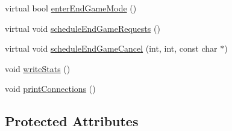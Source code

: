 \begin{DoxyCompactItemize}
\item 
virtual bool \hyperlink{classBTPeerWireBase_aa6dc6370b6ef5b1e84c7d02505ffebbf}{enter\+End\+Game\+Mode} ()
\item 
virtual void \hyperlink{classBTPeerWireBase_afc4fec75e43462e0197fad7100cc17a0}{schedule\+End\+Game\+Requests} ()
\item 
virtual void \hyperlink{classBTPeerWireBase_a061ffb43d2ff5ed63c9863c47c487792}{schedule\+End\+Game\+Cancel} (int, int, const char $\ast$)
\item 
void \hyperlink{classBTPeerWireBase_a52324b2b9722e0facde1083ace692308}{write\+Stats} ()
\item 
void \hyperlink{classBTPeerWireBase_a0361382dab9a77ede78aacef835a3470}{print\+Connections} ()
\end{DoxyCompactItemize}
\subsection*{Protected Attributes}
